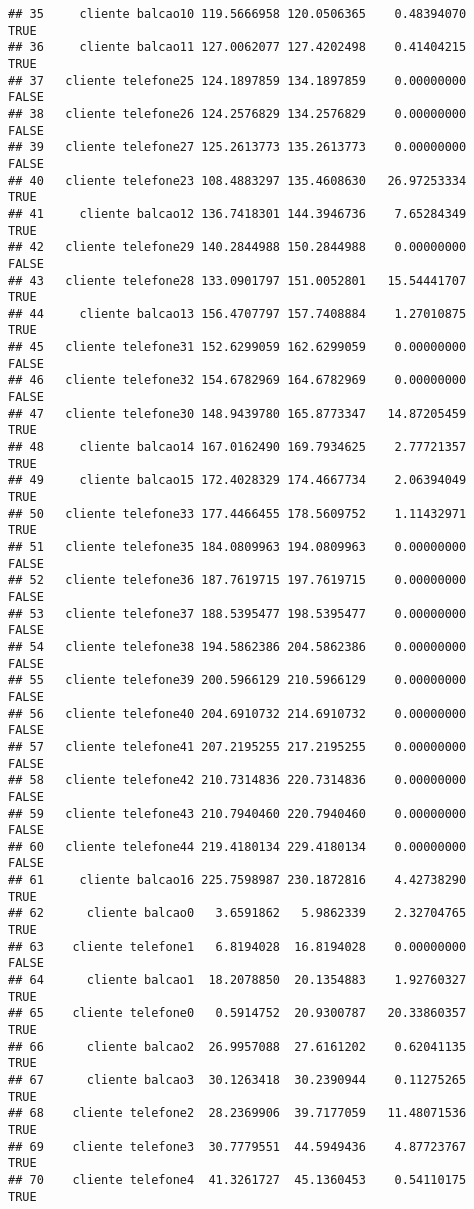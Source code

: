 \documentclass[
]{article}
\begin{document}
\begin{verbatim}
## 35     cliente balcao10 119.5666958 120.0506365    0.48394070     TRUE
## 36     cliente balcao11 127.0062077 127.4202498    0.41404215     TRUE
## 37   cliente telefone25 124.1897859 134.1897859    0.00000000    FALSE
## 38   cliente telefone26 124.2576829 134.2576829    0.00000000    FALSE
## 39   cliente telefone27 125.2613773 135.2613773    0.00000000    FALSE
## 40   cliente telefone23 108.4883297 135.4608630   26.97253334     TRUE
## 41     cliente balcao12 136.7418301 144.3946736    7.65284349     TRUE
## 42   cliente telefone29 140.2844988 150.2844988    0.00000000    FALSE
## 43   cliente telefone28 133.0901797 151.0052801   15.54441707     TRUE
## 44     cliente balcao13 156.4707797 157.7408884    1.27010875     TRUE
## 45   cliente telefone31 152.6299059 162.6299059    0.00000000    FALSE
## 46   cliente telefone32 154.6782969 164.6782969    0.00000000    FALSE
## 47   cliente telefone30 148.9439780 165.8773347   14.87205459     TRUE
## 48     cliente balcao14 167.0162490 169.7934625    2.77721357     TRUE
## 49     cliente balcao15 172.4028329 174.4667734    2.06394049     TRUE
## 50   cliente telefone33 177.4466455 178.5609752    1.11432971     TRUE
## 51   cliente telefone35 184.0809963 194.0809963    0.00000000    FALSE
## 52   cliente telefone36 187.7619715 197.7619715    0.00000000    FALSE
## 53   cliente telefone37 188.5395477 198.5395477    0.00000000    FALSE
## 54   cliente telefone38 194.5862386 204.5862386    0.00000000    FALSE
## 55   cliente telefone39 200.5966129 210.5966129    0.00000000    FALSE
## 56   cliente telefone40 204.6910732 214.6910732    0.00000000    FALSE
## 57   cliente telefone41 207.2195255 217.2195255    0.00000000    FALSE
## 58   cliente telefone42 210.7314836 220.7314836    0.00000000    FALSE
## 59   cliente telefone43 210.7940460 220.7940460    0.00000000    FALSE
## 60   cliente telefone44 219.4180134 229.4180134    0.00000000    FALSE
## 61     cliente balcao16 225.7598987 230.1872816    4.42738290     TRUE
## 62      cliente balcao0   3.6591862   5.9862339    2.32704765     TRUE
## 63    cliente telefone1   6.8194028  16.8194028    0.00000000    FALSE
## 64      cliente balcao1  18.2078850  20.1354883    1.92760327     TRUE
## 65    cliente telefone0   0.5914752  20.9300787   20.33860357     TRUE
## 66      cliente balcao2  26.9957088  27.6161202    0.62041135     TRUE
## 67      cliente balcao3  30.1263418  30.2390944    0.11275265     TRUE
## 68    cliente telefone2  28.2369906  39.7177059   11.48071536     TRUE
## 69    cliente telefone3  30.7779551  44.5949436    4.87723767     TRUE
## 70    cliente telefone4  41.3261727  45.1360453    0.54110175     TRUE

\end{verbatim}
\end{document}
